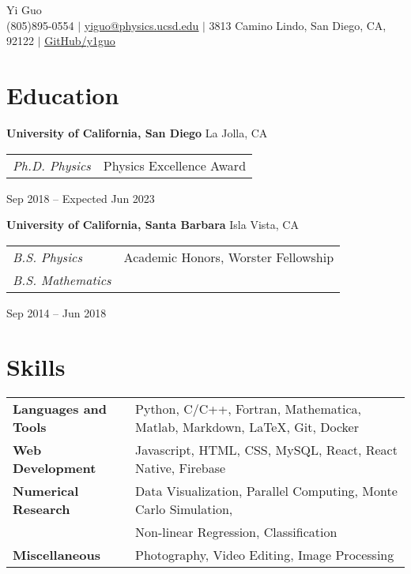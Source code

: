 \documentclass[letterpaper,12pt]{article}
\begin{document}
\newcommand{\name}{Yi Guo}
\newcommand{\phone}{(805)895-0554}
\newcommand{\email}{yiguo@physics.ucsd.edu}
\newcommand{\address}{3813 Camino Lindo, San Diego, CA, 92122}
\newcommand{\github}{y1guo}
\newcommand{\linkedin}{y1guo}
\newcommand{\website}{https://y1guo.github.io}

\begin{center}
    \Huge \name \\
    \vspace{1pt}
    \small \phone 
    $|$ \href{mailto:\email}{\underline{\email}} 
    $|$ \address
    $|$ \href{https://github.com/\github}{\underline{GitHub/\github}} 
    \vspace{-15pt}
\end{center}


\section{Education}

\textbf{University of California, San Diego} \hfill La Jolla, CA \\
\begin{tabular}{p{10em} p{20em}}
    \textit{Ph.D. Physics} 
    & Physics Excellence Award 
\end{tabular}
\hfill Sep 2018 -- Expected Jun 2023

\textbf{University of California, Santa Barbara} \hfill Isla Vista, CA \\
\begin{tabular}{p{10em} p{20em}}
    \textit{B.S. Physics}
    & Academic Honors, Worster Fellowship \\
    \textit{B.S. Mathematics}
    &
\end{tabular}
\hfill Sep 2014 -- Jun 2018


\section{Skills}

\begin{tabular}{p{10em} p{33em}}
    \textbf{Languages and Tools} 
    & Python, C/C++, Fortran, Mathematica, Matlab, Markdown, \LaTeX, Git, Docker \\
    \textbf{Web Development}
    & Javascript, HTML, CSS, MySQL, React, React Native, Firebase \\
    \textbf{Numerical Research} 
    & Data Visualization, Parallel Computing, Monte Carlo Simulation, \\
    & Non-linear Regression, Classification \\
    \textbf{Miscellaneous} 
    & Photography, Video Editing, Image Processing
\end{tabular}
\end{document}

